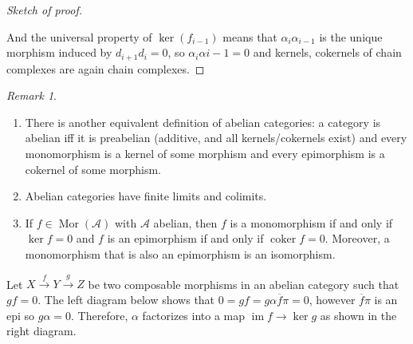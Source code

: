 \documentclass{article}
\newcommand{\Acat}{\mathcal{A}}
\DeclareMathOperator{\Mor}{Mor}
\DeclareMathOperator{\coker}{coker}
\DeclareMathOperator{\im}{im}
\DeclareMathOperator{\coim}{coim}
\theoremstyle{plain}
\theoremstyle{definition}
\theoremstyle{remark}
\newtheorem*{remark}{Remark}
\begin{document}
\begin{proof}[Sketch of proof]
\begin{center}
    \end{center}
    And the universal property of $\ker(f_{i-1})$ means that $\alpha_i \alpha_{i-1}$ is the unique morphism induced by $d_{i+1} d_i = 0$, so $\alpha_i \alpha{i-1} = 0$ and kernels, cokernels of chain complexes are again chain complexes.
\end{proof}

\begin{remark} \leavevmode
    \begin{enumerate}
        \item There is another equivalent definition of abelian categories: a category is abelian iff it is preabelian (additive, and all kernels/cokernels exist) and every monomorphism is a kernel of some morphism and every epimorphism is a cokernel of some morphism.
        \item Abelian categories have finite limits and colimits.
        \item If $f \in \Mor(\Acat)$ with $\Acat$ abelian, then $f$ is a monomorphism if and only if $\ker f = 0$ and $f$ is an epimorphism if and only if $\coker f = 0$. Moreover, a monomorphism that is also an epimorphism is an isomorphism.
    \end{enumerate}
\end{remark}

Let $X \xrightarrow{f} Y \xrightarrow{g} Z$ be two composable morphisms in an abelian category such that $gf = 0$. The left diagram below shows that $0 = gf = g\alpha \overline{f} \pi = 0$, however $\overline{f} \pi$ is an epi so $g\alpha = 0$. Therefore, $\alpha$ factorizes into a map $\im f \to \ker g$ as shown in the right diagram.
\begin{center}
     \hspace{3em}
\end{center}
\end{document}
